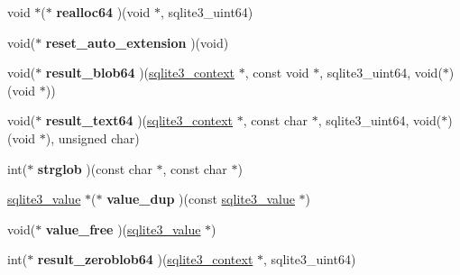 \begin{DoxyCompactItemize}
\item 
void $\ast$($\ast$ {\bfseries realloc64} )(void $\ast$, sqlite3\+\_\+uint64)\hypertarget{structsqlite3__api__routines_a70ff502fb988ab59ef938e1d490ee421}{}\label{structsqlite3__api__routines_a70ff502fb988ab59ef938e1d490ee421}

\item 
void($\ast$ {\bfseries reset\+\_\+auto\+\_\+extension} )(void)\hypertarget{structsqlite3__api__routines_a4b6b665952a3dfdf31bc6dc227353617}{}\label{structsqlite3__api__routines_a4b6b665952a3dfdf31bc6dc227353617}

\item 
void($\ast$ {\bfseries result\+\_\+blob64} )(\hyperlink{structsqlite3__context}{sqlite3\+\_\+context} $\ast$, const void $\ast$, sqlite3\+\_\+uint64, void($\ast$)(void $\ast$))\hypertarget{structsqlite3__api__routines_a1a122d054b1085e09d7c99db0fbf33d7}{}\label{structsqlite3__api__routines_a1a122d054b1085e09d7c99db0fbf33d7}

\item 
void($\ast$ {\bfseries result\+\_\+text64} )(\hyperlink{structsqlite3__context}{sqlite3\+\_\+context} $\ast$, const char $\ast$, sqlite3\+\_\+uint64, void($\ast$)(void $\ast$), unsigned char)\hypertarget{structsqlite3__api__routines_aa731fddf6223075f2c988a61db715908}{}\label{structsqlite3__api__routines_aa731fddf6223075f2c988a61db715908}

\item 
int($\ast$ {\bfseries strglob} )(const char $\ast$, const char $\ast$)\hypertarget{structsqlite3__api__routines_a5768d018c3bc78c1e7017aa350473891}{}\label{structsqlite3__api__routines_a5768d018c3bc78c1e7017aa350473891}

\item 
\hyperlink{structMem}{sqlite3\+\_\+value} $\ast$($\ast$ {\bfseries value\+\_\+dup} )(const \hyperlink{structMem}{sqlite3\+\_\+value} $\ast$)\hypertarget{structsqlite3__api__routines_a0e8f3a6285721d5bd5defacc40036b34}{}\label{structsqlite3__api__routines_a0e8f3a6285721d5bd5defacc40036b34}

\item 
void($\ast$ {\bfseries value\+\_\+free} )(\hyperlink{structMem}{sqlite3\+\_\+value} $\ast$)\hypertarget{structsqlite3__api__routines_ae6b17c54a3fdcd73f8152ac1cb12b1af}{}\label{structsqlite3__api__routines_ae6b17c54a3fdcd73f8152ac1cb12b1af}

\item 
int($\ast$ {\bfseries result\+\_\+zeroblob64} )(\hyperlink{structsqlite3__context}{sqlite3\+\_\+context} $\ast$, sqlite3\+\_\+uint64)\hypertarget{structsqlite3__api__routines_adfdaba542143d957923791ed43097971}{}\label{structsqlite3__api__routines_adfdaba542143d957923791ed43097971}


\end{DoxyCompactItemize}
